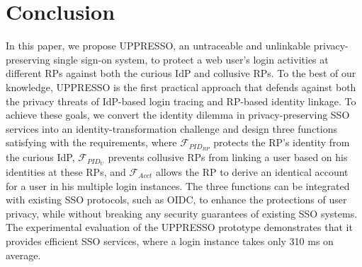 \section{Conclusion}
\label{sec:conclusion}
In this paper, we propose UPPRESSO, an untraceable and unlinkable privacy-preserving single sign-on system,
 to protect a web user's login activities at different RPs against both the curious IdP and collusive RPs.
To the best of our knowledge,
 UPPRESSO is the first practical approach
    that defends against both the privacy threats of IdP-based login tracing and RP-based identity linkage.
To achieve these goals, we convert the identity dilemma in privacy-preserving SSO services into an identity-transformation challenge
 and design three functions satisfying with the requirements,
 where $\mathcal{F}_{PID_{RP}}$ protects the RP's identity from the curious IdP,
 $\mathcal{F}_{PID_{U}}$ prevents collusive RPs from linking a user based on his identities at these RPs,
 and $\mathcal{F}_{Acct}$ allows the RP to derive an identical account for a user in his multiple login instances.
The three functions can be integrated with existing SSO protocols,
    such as OIDC,
    to enhance the protections of user privacy,
    while without breaking any security guarantees of existing SSO systems.
The experimental evaluation of the UPPRESSO prototype demonstrates
 that it provides efficient SSO services, where a login instance takes only 310 ms on average.
